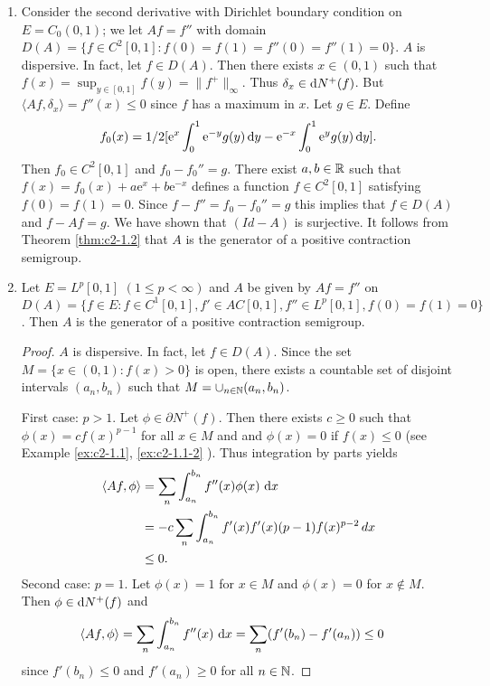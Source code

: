 \begin{examples}\label{ex:c2-1.5}
\begin{enumerate}[\upshape (i), wide, labelsep=.5em] %
\item \label{ex:c2-1.5-1}
Consider the second derivative with Dirichlet boundary condition on $E = C_{0}(0,1)$; \ie we let $Af = f''$ with domain $D(A) = \{f \in C^{2}[0,1] \colon f(0) = f(1) = f''(0) = f''(1) = 0\}$.
$A$ is dispersive. 
In fact, let $f \in D(A)$. 
Then there exists $x \in (0,1)$ such that $f(x) = \sup_{y \in [0,1]} f(y) = \|f^{+}\|_{\infty}$. 
Thus $\delta_{x} \in \mathop{}\!\mathrm{d}{N^{+}}(f)$. 
But $\langle Af,\delta_{x} \rangle = f''(x) \leq 0$ since $f$ has a maximum in $x$.
Let $g \in E$. 
Define 
\[
f_{0}(x) = 1/2 [\mathrm{e}^{x} \int_{0}^{1} \mathrm{e}^{-y}g(y) \mathop{}\!\mathrm{d}{y} - \mathrm{e}^{-x} \int_{0}^{1} \mathrm{e}^{y}g(y) \mathop{}\!\mathrm{d}{y}].
\]
Then $f_{0} \in C^{2}[0,1]$ and $f_{0} - f_{0}'' = g$. 
There exist $a, b \in \mathbb{R}$ such that $f(x) = f_{0}(x) + a\mathrm{e}^{x} + b\mathrm{e}^{-x}$ defines a function $f \in C^{2}[0,1]$ satisfying $f(0) = f(1) = 0$. Since $f - f'' = f_{0} - f_{0}'' = g$ this implies that $f \in D(A)$ and $f - Af = g$. We have shown that $(Id - A)$ is surjective. It follows from Theorem 
\ref{thm:c2-1.2} that $A$ is the generator of a positive contraction semigroup.
\item \label{ex:c2-1.5-2}
Let $E = L^{p}[0,1]$ $(1 \leq p < \infty)$ and $A$ be given by $Af = f''$ on $D(A) = \{f \in E \colon f \in C^{1}[0,1], f' \in AC[0,1], f'' \in L^{p}[0,1], f(0) = f(1) = 0\}$. 
Then $A$ is the generator of a positive contraction semigroup.
\begin{proof}
$A$ is dispersive. 
In fact, let $f \in D(A)$. 
Since the set $M = \{x \in (0,1) \colon f(x) > 0\}$ is open, there exists a countable set of disjoint intervals $(a_{n},b_{n})$ such that $M = \cup_{n \in \mathbb{N}} (a_{n},b_{n})$.

First case: $p > 1$.
Let $\phi \in \partial N^{+}(f)$. 
Then there exists $c \geq 0$ such that $\phi(x) = c f(x)^{p-1}$ for all $x \in M$ and and $\phi(x) = 0$ if $f(x) \leq 0$ (see Example \ref{ex:c2-1.1}, \ref{ex:c2-1.1-2} ). 
Thus integration by parts yields
\begin{align*}
\langle Af,\phi \rangle &= \sum_{n} \int_{a_{n}}^{b_{n}} f''(x)\phi(x) \, \mathop{}\!\mathrm{d}{x} \\
&= -c \sum_{n} \int_{a_{n}}^{b_{n}} f'(x)f'(x) (p-1)f(x)^{p-2} \, dx \\
&\leq 0.
\end{align*}
Second case: $p = 1$.
Let $\phi(x) = 1$ for $x \in M$ and $\phi(x) = 0$ for $x \not\in M$. 
Then $\phi \in \mathop{}\!\mathrm{d}{N^{+}}(f)$ and
\begin{align*}
\langle Af,\phi \rangle &= \sum_{n} \int_{a_{n}}^{b_{n}} f''(x) \, \mathop{}\!\mathrm{d}{x} = \sum_{n} (f'(b_{n}) - f'(a_{n})) \leq 0
\end{align*}
since $f'(b_{n}) \leq 0$ and $f'(a_{n}) \geq 0$ for all $n \in \mathbb{N}$.


\end{proof}
\end{enumerate}
\end{examples}
